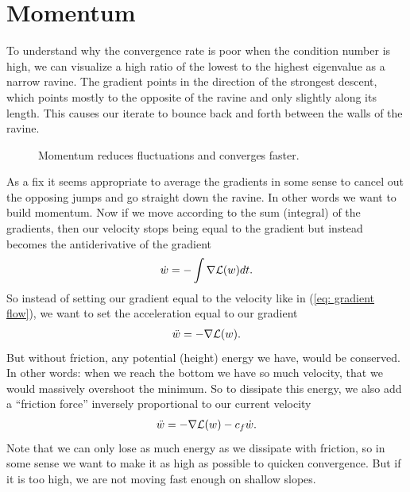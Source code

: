 
\chapter{Momentum}\label{chap: momentum}

To understand why the convergence rate is poor when the condition
number is high, we can visualize a high ratio of the lowest to the highest
eigenvalue as a narrow ravine. The gradient points in the direction of the
strongest descent, which points mostly to the opposite of the ravine and only slightly
along its length. This causes our iterate to bounce back and forth between
the walls of the ravine.
%
\begin{figure}[h]
	\centering
	\def\svgwidth{1\textwidth}
	
	\caption{Momentum reduces fluctuations and converges faster.}
	\label{fig: visualize bad conditioning}
\end{figure}

As a fix it seems appropriate to average the gradients in some sense to
cancel out the opposing jumps and go straight down the ravine. In other words
we want to build momentum. Now if we move according to the sum (integral) of
the gradients, then our velocity stops being equal to the gradient but instead
becomes the antiderivative of the gradient
\begin{align*}
	\dot{w} = -\int\nabla\mathcal{L}(w)dt.
\end{align*}
So instead of setting our gradient equal to the velocity like in (\ref{eq:
gradient flow}), we want to set the acceleration equal to our gradient
%
\begin{align*}
	\ddot{w} = -\nabla \mathcal{L}(w).
\end{align*}
%
But without friction, any potential (height) energy we have, would be conserved.
In other words: when we reach the bottom we have so much velocity, that we would
massively overshoot the minimum. So to dissipate this energy, we also
add a ``friction force'' inversely proportional to our current velocity
%
\begin{align}\label{eq: acceleration is gradient + friction}
	\ddot{w} = -\nabla \mathcal{L}(w) - c_f \dot{w}.
\end{align}
Note that we can only lose as much energy as we dissipate with friction, so in
some sense we want to make it as high as possible to quicken convergence. But
if it is too high, we are not moving fast enough on shallow slopes.


